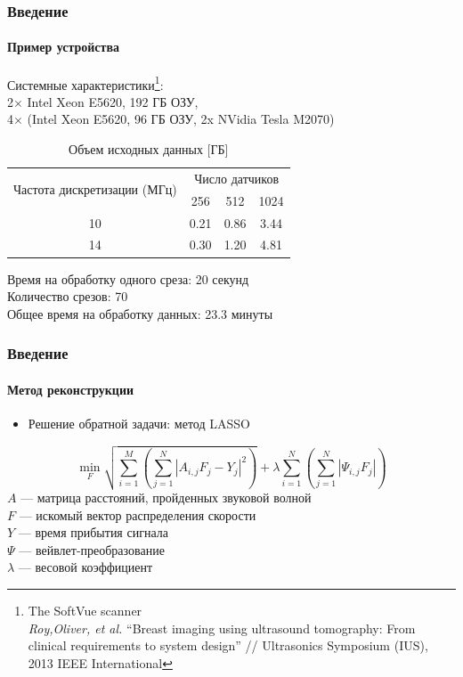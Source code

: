 \documentclass{beamer}
\begin{document}
\begin{frame}
\frametitle{Введение}
\framesubtitle{Пример устройства}
Системные характеристики\footnote{\tiny The SoftVue scanner\\\textit{Roy,Oliver, et al.} ``Breast imaging using ultrasound tomography: From clinical requirements to system design'' // Ultrasonics Symposium (IUS), 2013 IEEE International}:\\\small
2$\times$ Intel Xeon E5620, 192 ГБ ОЗУ,\\
4$\times$ (Intel Xeon E5620, 96 ГБ ОЗУ, 2x NVidia Tesla M2070)
\begin{table}[h]
\centering
\caption{\small Объем исходных данных [ГБ]}
\begin{tabular}{ c || c | c | c }
    \hline
    \multirow{2}{*}{Частота дискретизации (МГц)} & \multicolumn{3}{c}{Число датчиков}  \\ %
    & 256 & 512 & 1024 \\
    \hline
    10 & 0.21 & 0.86 & 3.44 \\
    14 & 0.30 & 1.20 & 4.81 \\
    \hline
\end{tabular}
\end{table}
\normalsize

Время на обработку одного среза: 20 секунд\\
Количество срезов: 70\\
Общее время на обработку данных: 23.3 минуты\\

\end{frame}

\begin{frame}
\frametitle{Введение}
\framesubtitle{Метод реконструкции}
\begin{itemize}
	\item Решение обратной задачи: метод LASSO
\end{itemize}
$$ \min_F  \sqrt{\displaystyle\sum_{i=1}^{M} (\displaystyle\sum_{j=1}^N | A_{i,j}F_j - Y_j |^2)} + \lambda \displaystyle\sum_{i=1}^N (\displaystyle\sum_{j=1}^N| \Psi_{i,j} F_j|) $$
$A$ --- матрица расстояний, пройденных звуковой волной\\
$F$ --- искомый вектор распределения скорости\\
$Y$ --- время прибытия сигнала\\
$\Psi$ --- вейвлет-преобразование\\
$\lambda$ --- весовой коэффициент\\
\end{frame}
\end{document}
